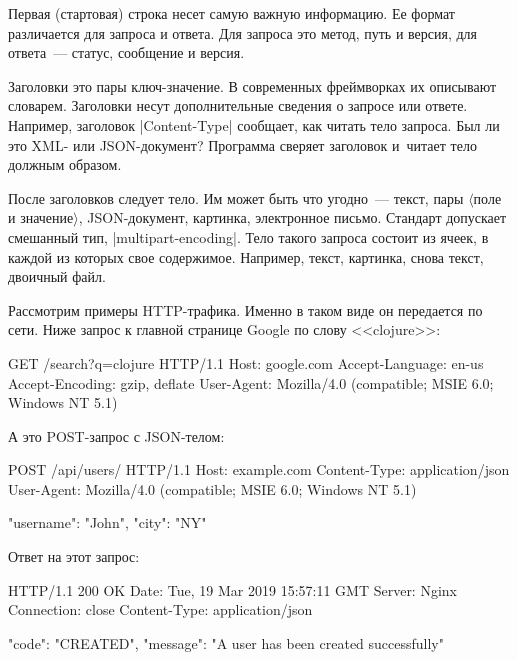 Первая (стартовая) строка несет самую важную информацию. Ее формат различается
для запроса и ответа. Для запроса это метод, путь и версия, для ответа~---
статус, сообщение и версия.

Заголовки это пары ключ-значение. В современных фреймворках их описывают
словарем. Заголовки несут дополнительные сведения о запросе или
ответе. Например, заголовок \spverb|Content-Type| сообщает, как читать тело
запроса. Был ли это XML- или JSON-документ? Программа сверяет заголовок и~читает
тело должным образом.

После заголовков следует тело. Им может быть что угодно~--- текст, пары
$\langle$поле и значение$\rangle$, JSON-документ, картинка, электронное
письмо. Стандарт допускает смешанный тип, \spverb|multipart-encoding|. Тело
такого запроса состоит из ячеек, в каждой из которых свое содержимое. Например,
текст, картинка, снова текст, двоичный файл.

Рассмотрим примеры HTTP-трафика. Именно в таком виде он передается по сети. Ниже
запрос к главной странице Google по слову <<clojure>>:

\begin{english}
  \begin{http}
GET /search?q=clojure HTTP/1.1
Host: google.com
Accept-Language: en-us
Accept-Encoding: gzip, deflate
User-Agent: Mozilla/4.0 (compatible; MSIE 6.0; Windows NT 5.1)
  \end{http}
\end{english}

\noindent
А это POST-запрос с JSON-телом:

\begin{english}
  \begin{http}
POST /api/users/ HTTP/1.1
Host: example.com
Content-Type: application/json
User-Agent: Mozilla/4.0 (compatible; MSIE 6.0; Windows NT 5.1)

{
  "username": "John",
  "city": "NY"
}
  \end{http}
\end{english}

\noindent
Ответ на этот запрос:

\begin{english}
  \begin{http}
HTTP/1.1 200 OK
Date: Tue, 19 Mar 2019 15:57:11 GMT
Server: Nginx
Connection: close
Content-Type: application/json

{
  "code": "CREATED",
  "message": "A user has been created successfully"
}
  \end{http}
\end{english}


